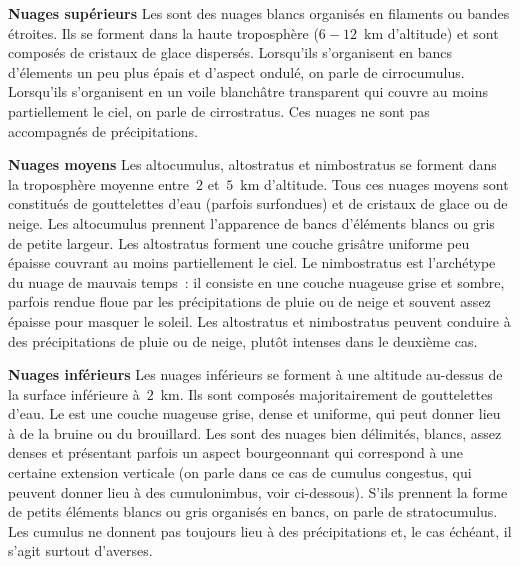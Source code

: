 
\begin{description}

\item{\textbf{Nuages supérieurs}} Les  sont des nuages blancs organisés en filaments ou bandes étroites. Ils se forment dans la haute troposphère ($6-12$~km d'altitude) et sont composés de cristaux de glace dispersés. Lorsqu'ils s'organisent en bancs d'élements un peu plus épais et d'aspect ondulé, on parle de cirrocumulus. Lorsqu'ils s'organisent en un voile blanchâtre transparent qui couvre au moins partiellement le ciel, on parle de cirrostratus. Ces nuages ne sont pas accompagnés de précipitations.

\item{\textbf{Nuages moyens}} Les altocumulus, altostratus et nimbostratus se forment dans la troposphère moyenne entre~$2$ et~$5$~km d'altitude. Tous ces nuages moyens sont constitués de gouttelettes d'eau (parfois surfondues) et de cristaux de glace ou de neige. Les altocumulus prennent l'apparence de bancs d'éléments blancs ou gris de petite largeur. Les altostratus forment une couche grisâtre uniforme peu épaisse couvrant au moins partiellement le ciel. Le nimbostratus est l'archétype du nuage de mauvais temps~: il consiste en une couche nuageuse grise et sombre, parfois rendue floue par les précipitations de pluie ou de neige et souvent assez épaisse pour masquer le soleil. Les altostratus et nimbostratus peuvent conduire à des précipitations de pluie ou de neige, plutôt intenses dans le deuxième cas.

\item{\textbf{Nuages inférieurs}} Les nuages inférieurs se forment à une altitude au-dessus de la surface inférieure à~$2$~km. Ils sont composés majoritairement de gouttelettes d'eau. Le  est une couche nuageuse grise, dense et uniforme, qui peut donner lieu à de la bruine ou du brouillard. Les  sont des nuages bien délimités, blancs, assez denses et présentant parfois un aspect bourgeonnant qui correspond à une certaine extension verticale (on parle dans ce cas de cumulus congestus, qui peuvent donner lieu à des cumulonimbus, voir ci-dessous). S'ils prennent la forme de petits éléments blancs ou gris organisés en bancs, on parle de stratocumulus. Les cumulus ne donnent pas toujours lieu à des précipitations et, le cas échéant, il s'agit surtout d'averses.

\end{description}

